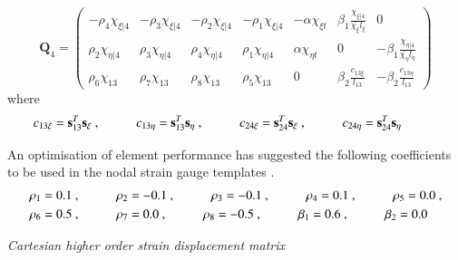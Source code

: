 \begin{equation} 
\mathbf{Q}_4 =
\begin{pmatrix}
-\rho_4 \chi_{\xi | 4} & -\rho_3 \chi_{\xi | 4} & -\rho_2 \chi_{\xi | 4} & -\rho_1 \chi_{\xi | 4} & -\alpha \chi_{\xi t} & \beta_1 \frac{\chi_{\xi | 4}}{\bar{\chi_\xi} l_\xi} & 0  \\	
\rho_2 \chi_{\eta | 4} & \rho_3 \chi_{\eta | 4} & \rho_4 \chi_{\eta | 4} & \rho_1 \chi_{\eta | 4} & \alpha \chi_{\eta t} & 0 & -\beta_1 \frac{\chi_{\eta | 4}}{\bar{\chi_\eta} l_\eta} \\
\rho_6 \chi_{13} & \rho_7 \chi_{13} & \rho_8 \chi_{13} & \rho_5 \chi_{13} & 0 & \beta_2 \frac{c_{13 \xi}}{l_{13}} & -\beta_2 \frac{c_{13 \eta}}{l_{13}}
\end{pmatrix}		
\label{equation15}
\end{equation}
where
\begin{align*} 
	c_{13 \xi} = \mathbf{s}_{13}^T \mathbf{s_\xi}\ ,
	\hspace{10mm}
	c_{13 \eta} = \mathbf{s}_{13}^T \mathbf{s_\eta}\ ,
	\hspace{10mm}
	c_{24 \xi} = \mathbf{s}_{24}^T \mathbf{s_\xi}\ ,
	\hspace{10mm}
	c_{24 \eta} = \mathbf{s}_{24}^T \mathbf{s_\eta}
	\hspace{10mm}
\end{align*}

An optimisation of element performance has suggested the following coefficients to be used in the nodal strain gauge templates \cite{Hau94}. 
\begin{gather} 
	\begin{aligned}
		&\rho_1 = 0.1\ ,
		\hspace{10mm}
		\rho_2 = -0.1\ ,
		\hspace{10mm}
		\rho_3 = -0.1\ ,
		\hspace{10mm}
		\rho_4 = 0.1\ ,
		\hspace{10mm}
		\rho_5 = 0.0\ , \\
		&\rho_6 = 0.5\ ,
		\hspace{10mm}
		\rho_7 = 0.0\ ,
		\hspace{10mm}
		\rho_8 = -0.5\ ,
		\hspace{10mm}
		\beta_1 = 0.6\ ,
		\hspace{10mm}
		\beta_2 = 0.0
		\label{equation16}
	\end{aligned}
\end{gather}

\textit{Cartesian higher order strain displacement matrix}


